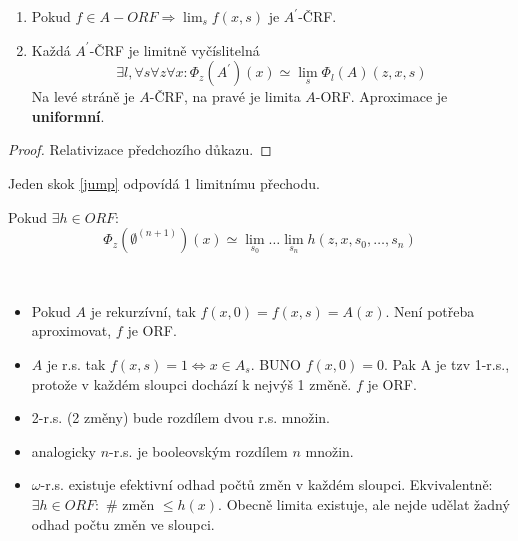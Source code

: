 \begin{theorem}
	\begin{enumerate}
		\item Pokud $f \in A-ORF \Rightarrow \lim_s f(x, s)$ je $A^{\prime}$-ČRF.
		\item Každá $A^{\prime}$-ČRF je limitně vyčíslitelná
			\[ \exists l, \forall s \forall z \forall x: \Phi_z(A^{\prime})(x) \simeq \lim_s \Phi_l(A)(z, x, s) \]
			Na levé stráně je $A$-ČRF, na pravé je limita $A$-ORF.
			Aproximace je \textbf{uniformní}.
	\end{enumerate}
\end{theorem}
\begin{proof}
	Relativizace předchozího důkazu.
\end{proof}

\begin{consequence}
	Jeden skok \cref{jump} odpovídá 1 limitnímu přechodu.
\end{consequence}

\begin{theorem}
	Pokud $\exists h \in ORF$:
	\[ \Phi_z(\emptyset^{(n + 1)})(x) \simeq \lim_{s_0} \ldots \lim_{s_n} h(z, x, s_0, \ldots, s_n) \]
\end{theorem}

\begin{note}~
	\begin{itemize}
		\item Pokud $A$ je rekurzívní, tak $f(x, 0) = f(x, s) = A(x)$.
	Není potřeba aproximovat, $f$ je ORF.
	\item $A$ je r.s. tak $f(x, s) = 1 \iff x \in A_s$. BUNO $f(x, 0) = 0$.
		Pak A je tzv 1-r.s., protože v každém sloupci dochází k nejvýš 1 změně.
		$f$ je ORF.
	\item 2-r.s. (2 změny) bude rozdílem dvou r.s. množin.
	\item analogicky $n$-r.s. je booleovským rozdílem $n$ množin.
	\item $\omega$-r.s. existuje efektivní odhad počtů změn v každém sloupci.
		Ekvivalentně: $\exists h \in ORF:$ \# změn $\leq h(x)$.
		Obecně limita existuje, ale nejde udělat žadný odhad počtu změn ve sloupci.
	\end{itemize}
\end{note}
